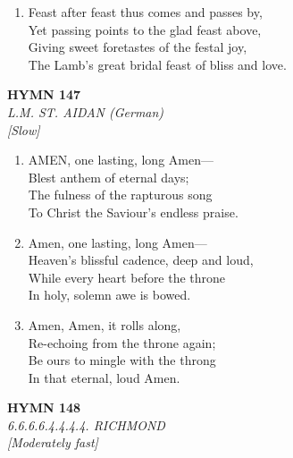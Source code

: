 \begin{enumerate}
    \item Feast after feast thus comes and passes by, \\
        Yet passing points to the glad feast above, \\
        Giving sweet foretastes of the festal joy, \\
        The Lamb's great bridal feast of bliss and love.

\end{enumerate}

\newpage
\begin{center}
    {\Large \textbf{HYMN 147}}
    \\
    \textit{L.M. ST. AIDAN (German)}
    \\
    \textit{\small [Slow]}
\end{center}
\vspace{1em}

\begin{enumerate}
    \item AMEN, one lasting, long Amen--- \\
        Blest anthem of eternal days; \\
        The fulness of the rapturous song \\
        To Christ the Saviour's endless praise.

    \item Amen, one lasting, long Amen--- \\
        Heaven's blissful cadence, deep and loud, \\
        While every heart before the throne \\
        In holy, solemn awe is bowed.

    \item Amen, Amen, it rolls along, \\
        Re-echoing from the throne again; \\
        Be ours to mingle with the throng \\
        In that eternal, loud Amen.

\end{enumerate}

\newpage
\begin{center}
    {\Large \textbf{HYMN 148}}
    \\
    \textit{6.6.6.6.4.4.4.4. RICHMOND}
    \\
    \textit{\small [Moderately fast]}
\end{center}
\vspace{1em}

